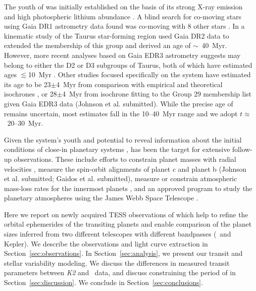 \documentclass[twocolumn]{aastex631}
\begin{document}
The youth of \sname was initially established on the basis of its strong X-ray emission \citep{Wichmann1996} and high photospheric lithium abundance \citep{Wichmann2000}. A blind search for co-moving stars using Gaia DR1 astrometry data found \sname was co-moving with 8 other stars \citep[Group 29 in][]{Oh2017}. In a kinematic study of the Taurus star-forming region \citet{Luhman2018} used Gaia DR2 data to extended the membership of this group and derived an age of $\sim$~40~Myr. However, more recent analyses based on Gaia EDR3 astrometry suggests \sname may belong to either the D2 or D3 subgroups of Taurus, both of which have estimated ages $\lesssim$10~Myr \citep[][Gaidos et al. submitted]{Krolikowski2021}. Other studies focused specifically on the \sname system have estimated its age to be 23$\pm$4~Myr from comparison with empirical and theoretical isochrones \citep{David2019b}, or 28$\pm$4~Myr from isochrone fitting to the \citet{Luhman2018} Group 29 membership list given Gaia EDR3 data (Johnson et al. submitted). While the precise age of \sname remains uncertain, most estimates fall in the 10--40~Myr range and we adopt $t \approx$~20--30~Myr.


Given the system's youth and potential to reveal information about the initial conditions of close-in planetary systems \citep[e.g.][]{Poppenhaeger2021, Owen2020}, \sname has been the target for extensive follow-up observations. These include efforts to constrain planet masses with radial velocities \citep{Beichman2019}, measure the spin-orbit alignments of planet c \citep{Feinstein21} and planet b (Johnson et al. submitted; Gaidos et al. submitted), measure or constrain atmospheric mass-loss rates for the innermost planets \citep{Schlawin21, Vissapragada21}, and an approved program to study the planetary atmospheres using the James Webb Space Telescope \citep{Desert2021}.


Here we report on newly acquired TESS observations of \sname which help to refine the orbital ephemerides of the transiting planets and enable comparison of the planet sizes inferred from two different telescopes with different bandpasses (\tess\ and Kepler). We describe the observations and light curve extraction in Section~\ref{sec:observations}. In Section~\ref{sec:analysis}, we present our transit and stellar variability modeling. We discuss the differences in measured transit parameters between \textit{K2} and \tess\ data, and discuss constraining the period of \planete in Section~\ref{sec:discussion}. We conclude in Section~\ref{sec:conclusions}.
\end{document}
